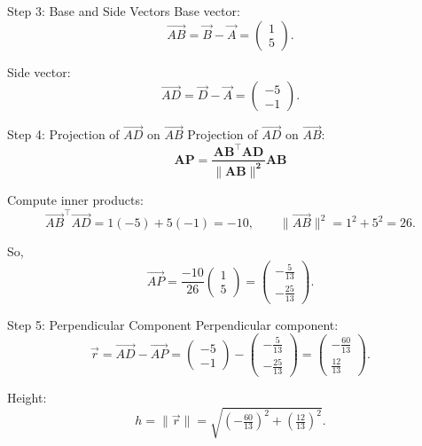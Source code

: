 \documentclass{beamer}
\begin{document}
\begin{frame}{Step 3: Base and Side Vectors}
Base vector:
\begin{equation}
\vec{AB}=\vec B-\vec A=\begin{pmatrix}1\\5\end{pmatrix}.
\end{equation}

Side vector:
\begin{equation}
\vec{AD}=\vec D-\vec A=\begin{pmatrix}-5\\-1\end{pmatrix}.
\end{equation}
\end{frame}

\begin{frame}{Step 4: Projection of $\vec{AD}$ on $\vec{AB}$}
Projection of $\vec{AD}$ on $\vec{AB}$:
\begin{equation}
\mathbf{AP = \frac{AB^\top AD}{\|AB\|^2} AB}
\end{equation}

Compute inner products:
\begin{equation}
\vec{AB}^\top\vec{AD}=1(-5)+5(-1)=-10,
\qquad
\|\vec{AB}\|^2=1^2+5^2=26.
\end{equation}

So,
\begin{equation}
\vec{AP}
=\frac{-10}{26}\begin{pmatrix}1\\5\end{pmatrix}
=\begin{pmatrix}-\tfrac{5}{13}\\[4pt]-\tfrac{25}{13}\end{pmatrix}.
\end{equation}
\end{frame}

\begin{frame}{Step 5: Perpendicular Component}
Perpendicular component:
\begin{equation}
\vec r=\vec{AD}-\vec{AP}
=\begin{pmatrix}-5\\-1\end{pmatrix}
-\begin{pmatrix}-\tfrac{5}{13}\\[4pt]-\tfrac{25}{13}\end{pmatrix}
=\begin{pmatrix}-\tfrac{60}{13}\\[4pt]\tfrac{12}{13}\end{pmatrix}.
\end{equation}

Height:
\begin{equation}
h=\|\vec r\|
=\sqrt{\left(-\tfrac{60}{13}\right)^2+\left(\tfrac{12}{13}\right)^2}.
\end{equation}
\end{frame}
\end{document}
